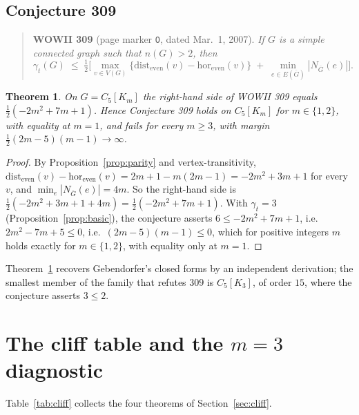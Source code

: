 \documentclass[10pt,a4paper]{article}
\theoremstyle{plain}
\newtheorem{theorem}{Theorem}[section]
\theoremstyle{definition}
\newcommand{\de}{\mathrm{dist_{even}}}
\newcommand{\eh}{\mathrm{hor_{even}}}
\newcommand{\gt}{\gamma_t}
\newcommand{\blow}[2]{#1[K_{#2}]}
\begin{document}
\subsection{Conjecture 309}

\begin{quote}
\textbf{WOWII 309} (page marker \texttt{O}, dated Mar.\ 1, 2007). \emph{If $G$ is a simple
connected graph such that $n(G) > 2$, then}
\[
\gt(G) \;\le\; \tfrac12\Big[\max_{v \in V(G)}\big\{\de(v) - \eh(v)\big\}
\;+\; \min_{e \in E(\overline{G})} |N_{\overline{G}}(e)|\Big].
\]
\end{quote}

\begin{theorem}\label{thm:309}
On $G = \blow{C_5}{m}$ the right-hand side of WOWII 309 equals
$\tfrac12(-2m^2 + 7m + 1)$. Hence Conjecture 309 holds on $\blow{C_5}{m}$ for
$m \in \{1,2\}$, with equality at $m = 1$, and fails for every $m \ge 3$, with margin
$\tfrac12(2m-5)(m-1) \to \infty$.
\end{theorem}

\begin{proof}
By Proposition~\ref{prop:parity} and vertex-transitivity, $\de(v) - \eh(v) = 2m+1 - m(2m-1) =
-2m^2 + 3m + 1$ for every $v$, and $\min_e |N_{\overline{G}}(e)| = 4m$. So the right-hand side
is $\tfrac12(-2m^2+3m+1+4m) = \tfrac12(-2m^2+7m+1)$. With $\gt = 3$
(Proposition~\ref{prop:basic}), the conjecture asserts $6 \le -2m^2+7m+1$, i.e.\
$2m^2 - 7m + 5 \le 0$, i.e.\ $(2m-5)(m-1) \le 0$, which for positive integers $m$ holds exactly
for $m \in \{1,2\}$, with equality only at $m = 1$.
\end{proof}

Theorem~\ref{thm:309} recovers Gebendorfer's closed forms \cite{geb309} by an independent
derivation; the smallest member of the family that refutes $309$ is $\blow{C_5}{3}$, of order
$15$, where the conjecture asserts $3 \le 2$.

\section{The cliff table and the $m = 3$ diagnostic}\label{sec:diagnostic}

Table~\ref{tab:cliff} collects the four theorems of Section~\ref{sec:cliff}.
\end{document}
